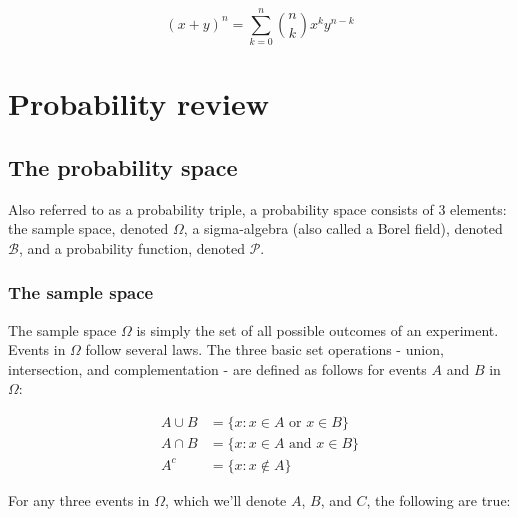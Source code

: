 \documentclass{report}
\begin{document}
\begin{equation}\label{eq:binomial-theorem}
    (x + y)^n = \sum_{k=0}^n \binom{n}{k} x^ky^{n-k}
\end{equation}

\section{Probability review}\label{sec:tools-probability}

\subsection{The probability space}

Also referred to as a probability triple, a probability space consists of 3 elements: the sample space, denoted $\Omega$, a sigma-algebra (also called a Borel field), denoted $\mathcal{B}$, and a probability function, denoted $\mathcal{P}$. 

\subsubsection{The sample space}

The sample space $\Omega$ is simply the set of all possible outcomes of an experiment. Events in $\Omega$ follow several laws. The three basic set operations - union, intersection, and complementation - are defined as follows for events $A$ and $B$ in $\Omega$:

\begin{equation}\label{eq:set-union-intersection}
    \begin{aligned}
        A \cup B &= \{x: x \in A \text{ or } x \in B\} \\
        A \cap B &= \{x: x \in A \text{ and } x \in B\} \\
        A^c &= \{x: x \notin A\}
    \end{aligned}
\end{equation}

For any three events in $\Omega$, which we'll denote $A$, $B$, and $C$, the following are true:
\end{document}
